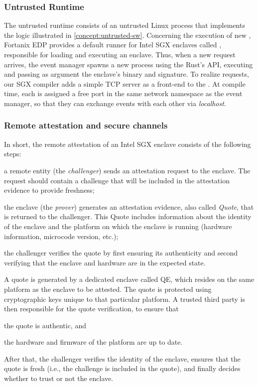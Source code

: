 \subsubsection{Untrusted Runtime}

The untrusted runtime consists of an untrusted Linux process that implements the
logic illustrated in \cref{concept:untrusted-sw}. Concerning the execution of
new \protmods, Fortanix \ac{EDP} provides a default runner for Intel \ac{SGX}
enclaves called , responsible for loading and executing an
enclave. Thus, when a new \loadmodule{} request arrives, the event manager
spawns a new process using the Rust's  API,
executing  and passing as argument the enclave's binary and
signature. To realize \callentry{} requests, our SGX compiler adds a simple TCP
server as a front-end to the \protmod{}. At compile time, each \protmod{} is
assigned a free port in the same network namespace as the event manager, so that
they can exchange events with each other via \emph{localhost}. 

\subsubsection{Remote attestation and secure channels}
\label{impl:sgx-attestation}

In short, the remote attestation of an Intel \ac{SGX} enclave consists of
the following steps:
%
\begin{paraenum}
  \item a remote entity (the \emph{challenger}) sends an attestation request
   to the enclave. The request should contain a challenge that will be
  included in the attestation evidence to provide freshness;
  \item the enclave (the \emph{prover}) generates an attestation evidence, 
  also called \emph{Quote}, that is returned
   to the challenger. This Quote 
   includes information about the identity of the enclave and the platform
   on which the enclave is running (hardware information, microcode version, etc.);
  \item the challenger verifies the quote by first ensuring its authenticity 
  and second verifying that the enclave and hardware are in the expected state.
\end{paraenum}

A quote is generated by a dedicated enclave called \ac{QE}, which resides on the
same platform as the enclave to be attested. The quote is protected using
cryptographic keys unique to that particular platform. A trusted third party is
then responsible for the quote verification, to ensure that 
%
\begin{paraenum}
  \item the quote is authentic, and
  \item the hardware and firmware of the platform are up to date.
\end{paraenum}
%
After that, the challenger verifies the identity of the enclave, ensures that
the quote is fresh (i.e., the challenge is included in the quote), and finally
decides whether to trust or not the enclave.

